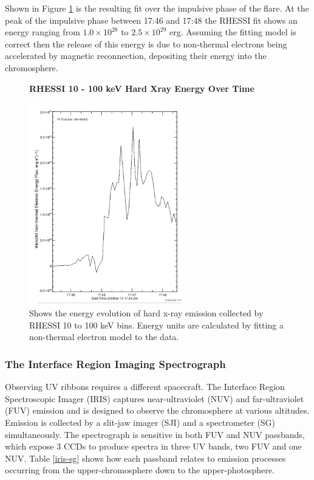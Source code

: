 Shown in Figure \ref{erhessi} is the resulting fit over the impulsive phase of the flare. At the peak of the impulsive phase between 17:46 and 17:48 the RHESSI fit shows an energy ranging from $1.0{\times}10^{28}$ to $2.5{\times}10^{29}$ erg. Assuming the fitting model is correct then the release of this energy is due to non-thermal electrons being accelerated by magnetic reconnection, depositing their energy into the chromosphere. 

\begin{figure}[H]
  \begin{center}
  \textbf{RHESSI 10 - 100 keV Hard Xray Energy Over Time}\par\medskip
  \includegraphics[width=0.6\textwidth]{rhessi-energy-curve}
  \end{center}
  \caption{Shows the energy evolution of hard x-ray emission collected by RHESSI 10 to 100 keV bins. Energy units are calculated by fitting a non-thermal electron model to the data. }\label{erhessi}
\end{figure}


\subsubsection{The Interface Region Imaging Spectrograph}
Observing UV ribbons requires a different spacecraft. The Interface Region Spectroscopic Imager (IRIS) captures near-ultraviolet (NUV) and far-ultraviolet (FUV) emission and is designed to observe the chromosphere at various altitudes. Emission is collected by a slit-jaw imager (SJI) and a spectrometer (SG) simultaneously. The spectrograph is sensitive in both FUV and NUV passbands, which expose 3 CCDs to produce spectra in three UV bands, two FUV and one NUV. Table \ref{iris-sg} shows how each passband relates to emission processes occurring from the upper-chromosphere down to the upper-photosphere.

